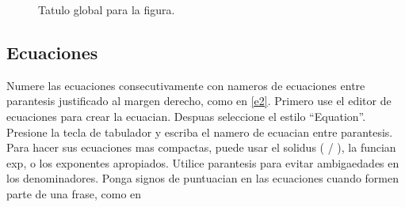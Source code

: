 \documentclass[5p,times,authoryear]{elsarticle}
\begin{document}
\begin{figure}[tb]
\centering
{}

\label{mifigura}
\caption{Tatulo global para la figura.}
\end{figure}

\subsection{Ecuaciones}

Numere las ecuaciones consecutivamente con nameros de ecuaciones
entre parantesis justificado al margen derecho, como en \eqref{e2}.
Primero use el editor de ecuaciones para crear la ecuacian. Despuas
seleccione el estilo ``Equation''. Presione la tecla de tabulador y
escriba el namero de ecuacian entre parantesis. Para hacer sus
ecuaciones mas compactas, puede usar el solidus ( / ), la funcian
exp, o los exponentes apropiados. Utilice parantesis para evitar
ambigaedades en los denominadores. Ponga signos de puntuacian en las
ecuaciones cuando formen parte de una frase, como en
\end{document}
